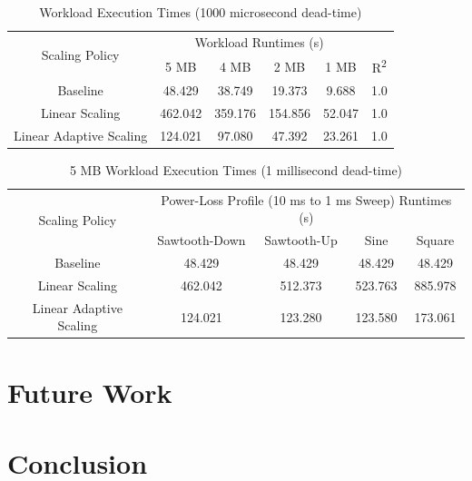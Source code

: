 \documentclass[journal, twoside]{IEEEtran}
\begin{document}
\begin{table}
    \renewcommand{\arraystretch}{1.3} %
    \caption{Workload Execution Times (1000 microsecond dead-time)}
    \label{workload-size-performance}
    \centering
    \begin{tabular}{c||c|c|c|c|c}
        \hline
        \multirow{2}{*}{Scaling Policy} & \multicolumn{4}{c|}{Workload Runtimes (s)}\\\cline{2-6}
        {} & {5 MB} & {4 MB} & {2 MB} & {1 MB} & {R\textsuperscript{2}}\\
        \hline
        \hline
        {Baseline}                  &  {48.429} &  {38.749} &  {19.373} &   {9.688} & {1.0}\\
        {Linear Scaling}            & {462.042} & {359.176} & {154.856} &  {52.047} & {1.0}\\
        {Linear Adaptive Scaling}   & {124.021} &  {97.080} &  {47.392} &  {23.261} & {1.0}\\
        \hline
    \end{tabular}
\end{table}

\begin{table}
    \renewcommand{\arraystretch}{1.3} %
    \caption{5 MB Workload Execution Times (1 millisecond dead-time)}
    \label{power-loss-profile-performance}
    \centering
    \begin{tabular}{c||c|c|c|c}
        \hline
        \multirow{2}{*}{Scaling Policy} & \multicolumn{4}{c}{Power-Loss Profile (10 ms to 1 ms Sweep) Runtimes (s)} \\\cline{2-5}
        {} & {Sawtooth-Down} & {Sawtooth-Up} & {Sine} & {Square}\\
        \hline
        \hline
        {Baseline}                  &  {48.429} &  {48.429} &  {48.429} &  {48.429}\\
        {Linear Scaling}            & {462.042} & {512.373} & {523.763} & {885.978}\\
        {Linear Adaptive Scaling}   & {124.021} & {123.280} & {123.580} & {173.061}\\
        \hline
    \end{tabular}
\end{table}

\section{Future Work}

\section{Conclusion}



\end{document}
